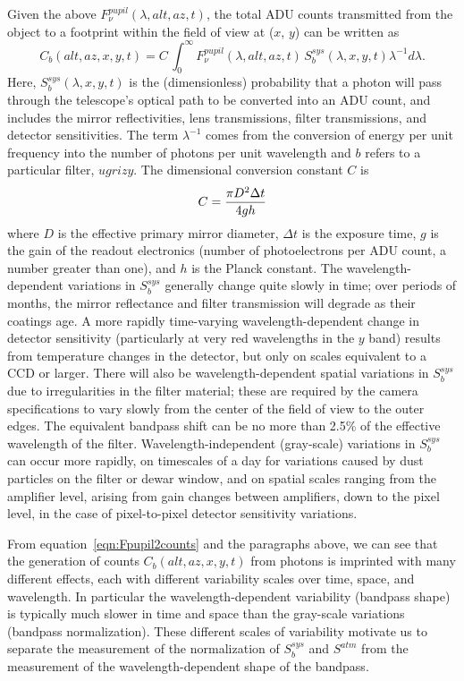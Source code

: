 \documentclass[12pt,preprint]{aastex}
\begin{document}
Given the above $F_\nu^{pupil}(\lambda,alt,az,t)$, the total ADU
counts transmitted from the object to a footprint within the field of
view at ($x$, $y$) can be written as
\begin{equation}
\label{eqn:Fpupil2counts}
    C_b(alt, az, x,y,t) = C \, \int_0^\infty {F_\nu^{pupil}(\lambda,alt,az,t) \, S_b^{sys}(\lambda,x,y,t) \lambda^{-1}d\lambda}.
\end{equation}
Here, $S_b^{sys}(\lambda,x,y,t)$ is the (dimensionless) probability
that a photon will pass through the telescope's optical path to be
converted into an ADU count, and 
includes the mirror reflectivities, lens transmissions, filter
transmissions, and detector sensitivities. The term
$\lambda^{-1}$ comes from the conversion of energy per unit frequency
into the number of photons per unit wavelength and $b$ refers to a particular filter, $ugrizy$. The
dimensional conversion constant $C$ is
\begin{equation}
\label{eqn:Cconstant}
        C = {\pi D^2 \Delta t \over 4 g h }  
\end{equation}
where $D$ is the effective primary mirror diameter, $\Delta t$ is the
exposure time, $g$ is the gain of the readout electronics (number of
photoelectrons per ADU count, a number greater than one), and $h$ is
the Planck constant. The wavelength-dependent variations in
$S_b^{sys}$ generally change quite slowly in time; over periods of
months, the mirror reflectance and filter transmission will degrade as
their coatings age. A more rapidly time-varying wavelength-dependent
change in detector sensitivity (particularly at very red wavelengths
in the $y$ band) results from temperature changes in the detector, but
only on scales equivalent to a CCD or larger.  There will also be
wavelength-dependent spatial variations in $S_b^{sys}$ due to
irregularities in the filter material; these are required by the
camera specifications to vary 
slowly from the center of the field of view to the outer edges.  The
equivalent bandpass shift can be no more than 2.5\% of the effective
wavelength of the filter. Wavelength-independent (gray-scale)
variations in $S_b^{sys}$ can occur more rapidly, on timescales of a
day for variations caused by dust particles on the filter or dewar
window, and on spatial scales ranging from the amplifier level,
arising from gain changes between amplifiers, down to the pixel level,
in the case of pixel-to-pixel detector sensitivity variations.

From equation~\ref{eqn:Fpupil2counts} and the paragraphs above, we can
see that the generation of counts $C_b(alt,az,x,y,t)$ from photons is
imprinted with many different effects, each with different variability
scales over time, space, and wavelength. In particular the
wavelength-dependent variability (bandpass shape) is
typically much slower in time and space than the gray-scale variations
(bandpass normalization). These different scales of variability
motivate us to separate the measurement of the normalization of
$S_b^{sys}$ and $S^{atm}$ from the measurement of the
wavelength-dependent shape of the bandpass.
\end{document}
